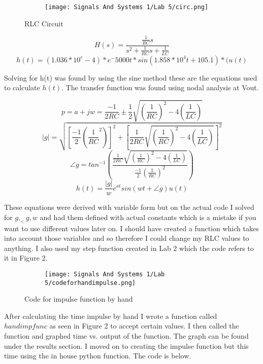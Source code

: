 \documentclass[12pt,a4paper]{article}
\begin{document}
\begin{figure}[h]
\begin{subfigure}{ 1\textwidth}
\texttt{[image: Signals And Systems 1/Lab 5/circ.png]}
\end{subfigure}
\caption{RLC Circuit}
\label{fig:image2}
\end{figure}






\[H(s) = \frac{\frac{1}{RC}s}{s^2+\frac{1}{RC}s + \frac{1}{LC}}\]
\[h(t)=(1.036*10^e-4)*e^-5000t*sin(1.858*10^4t+105.1)*(u(t)\] 



Solving for h(t) was found by using the sine method these are the equations used to calculate $h(t)$. The transfer function was found using nodal analysis at Vout.





\[p = a +jw = \frac{-1}{2RC} ± \frac{1}{2}\sqrt{(\frac{1}{RC})^2 - 4(\frac{1}{LC})}\]
\[|g| = \sqrt{[\frac{-1}{2}(\frac{1}{RC}^2)]^2+[\frac{1}{2RC}\sqrt{(\frac{1}{RC})^2-4(\frac{1}{LC})}]^2}\]
\[∠g = tan^{-1}(\frac{\frac{1}{2RC}\sqrt{(\frac{1}{RC})^2-4(\frac{1}{LC})}}{\frac{-1}{2}(\frac{1}{RC})^2})\]
\[h(t) = \frac{|g|}{w}e^{at}sin(wt + ∠g)u(t)\]

These equations were derived with variable form but on the actual code I solved for $g,_<g,w$ and had them defined with actual constants which is a mistake if you want to use different values later on. I should have created a function which takes into account those variables and so therefore I could change my RLC values to anything. I also used my step function created in Lab 2 which the code refers to it in Figure 2.



\begin{figure}[h]
\begin{subfigure}{ 1\textwidth}
\texttt{[image: Signals And Systems 1/Lab 5/codeforhandimpulse.png]}
\end{subfigure}
\caption{Code for impulse function by hand}
\label{fig:image2}
\end{figure}
\clearpage
After calculating the time impulse by hand I wrote a function called $handimpfunc$ as seen in Figure 2 to accept certain values. I then called the function and graphed time vs. output of the function. The graph can be found under the results section. I moved on to creating the impulse function but this time using the in house python function. The code is below.
\end{document}

